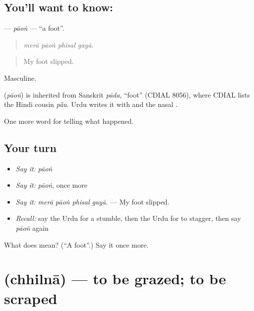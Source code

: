 \subsection*{You'll want to know: }
\textbf{} — \emph{pāoṅ} — \textquotedblleft{}a foot\textquotedblright{}.

\begin{quote}
   
\end{quote}

\begin{quote}
\emph{merā pāoṅ phisal gayā.}
\end{quote}

\begin{quote}
My foot slipped.
\end{quote}

Masculine.

\begin{cousinweb}
\textbf{} (\emph{pāoṅ}) is inherited from Sanskrit \emph{pāda}, \textquotedblleft{}foot\textquotedblright{} (CDIAL 8056), where CDIAL lists the Hindi cousin \emph{pā̃u}. Urdu writes it with \textbf{} and the nasal \textbf{}.
\end{cousinweb}

\begin{grammarlens}[title={What you've built}]
One more word for telling what happened.
\end{grammarlens}

\subsection*{Your turn}
\begin{itemize}
\raggedright
  \item \emph{Say it:} \emph{pāoṅ}
  \item \emph{Say it:} \emph{pāoṅ}, once more
  \item \emph{Say it:} \emph{merā pāoṅ phisal gayā.} — My foot slipped.
  \item \emph{Recall:} say the Urdu for a stumble, then the Urdu for to stagger, then say \emph{pāoṅ} again
\end{itemize}

\begin{tcolorbox}[breakable,colback=teal!4,colframe=teal!35!black,title={Before you move on}]
What does  mean? (\textquotedblleft{}A foot\textquotedblright{}.) Say it once more.
\end{tcolorbox}
\section[\texorpdfstring{\ur{چھلنا} (chhilnā)}{چھلنا (chhilnā)}]{ (chhilnā) — to be grazed; to be scraped}

